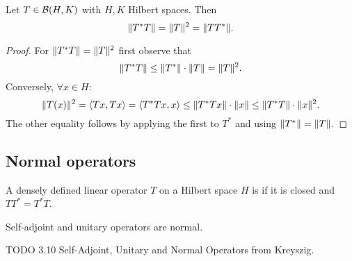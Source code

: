 \begin{proposition} \label{normOfSquare}
Let $T\in \operatorname{\mathcal{B}}(H,K)$ with $H,K$ Hilbert spaces. Then
\[ \lVert T^*T\rVert= \lVert T\rVert^2 = \lVert TT^*\rVert. \]
\end{proposition}
\begin{proof}
For $\lVert T^*T\rVert= \lVert T\rVert^2$ first observe that
\[ \lVert T^*T\rVert \leq \lVert T^*\rVert\cdot\lVert T\rVert = \lVert T\rVert^2. \]
Conversely, $\forall x\in H$:
\[ \lVert T(x)\rVert^2 = \left\langle Tx,Tx \right\rangle = \left\langle T^*Tx,x \right\rangle \leq \lVert T^*Tx\rVert\cdot \lVert x\rVert \leq \lVert T^*T\rVert\cdot\lVert x\rVert^2. \]
The other equality follows by applying the first to $T^*$ and using $\lVert T^*\rVert=\lVert T\rVert$.
\end{proof}

\subsection{Normal operators}
\begin{definition}
A densely defined linear operator $T$ on a Hilbert space $H$ is  if it is closed and $TT^* = T^*T$.
\end{definition}
Self-adjoint and unitary operators are normal.

TODO 3.10 Self-Adjoint, Unitary and Normal Operators from Kreyszig.


